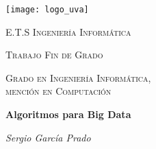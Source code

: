 \documentclass{subfiles}
\begin{document}
  \newgeometry{}

  \begin{titlepage}

    \centering
    \texttt{[image: logo\_uva]}\par\vspace{1cm}

    {\scshape\LARGE E.T.S Ingeniería Informática \par}
    \vspace{1cm}

    {\scshape\Large Trabajo Fin de Grado\par}
    \vspace{1.5cm}

    {\scshape\Large Grado en Ingeniería Informática, \\ mención en Computación\par}
    \vspace{1.5cm}

    {\huge\bfseries Algoritmos para Big Data\par}
    \vspace{2cm}

    {\Large\itshape Sergio García Prado \par}
    \vfill

  \end{titlepage}

  \restoregeometry
  \setcounter{page}{1}
\end{document}

